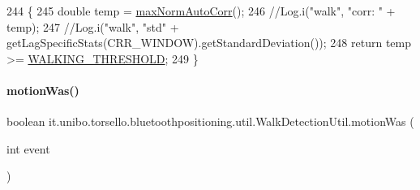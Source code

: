 \begin{DoxyCode}
244                                           \{
245         \textcolor{keywordtype}{double} temp = \hyperlink{classit_1_1unibo_1_1torsello_1_1bluetoothpositioning_1_1util_1_1WalkDetectionUtil_a1145bc9ce4fd56c11ca664eee090b5a1_a1145bc9ce4fd56c11ca664eee090b5a1}{maxNormAutoCorr}();
246         \textcolor{comment}{//Log.i("walk", "corr: " + temp);}
247         \textcolor{comment}{//Log.i("walk", "std" + getLagSpecificStats(CRR\_WINDOW).getStandardDeviation());}
248         \textcolor{keywordflow}{return} temp >= \hyperlink{classit_1_1unibo_1_1torsello_1_1bluetoothpositioning_1_1util_1_1WalkDetectionUtil_acb342863aac2cb0746674b64faad451d_acb342863aac2cb0746674b64faad451d}{WALKING\_THRESHOLD};
249     \}
\end{DoxyCode}
\hypertarget{classit_1_1unibo_1_1torsello_1_1bluetoothpositioning_1_1util_1_1WalkDetectionUtil_af8ca05990e58c5911f943c16ea50e8ae_af8ca05990e58c5911f943c16ea50e8ae}{}\label{classit_1_1unibo_1_1torsello_1_1bluetoothpositioning_1_1util_1_1WalkDetectionUtil_af8ca05990e58c5911f943c16ea50e8ae_af8ca05990e58c5911f943c16ea50e8ae} 
\paragraph{\texorpdfstring{motion\+Was()}{motionWas()}}
{\footnotesize\ttfamily boolean it.\+unibo.\+torsello.\+bluetoothpositioning.\+util.\+Walk\+Detection\+Util.\+motion\+Was (\begin{DoxyParamCaption}\item[{int}]{event }\end{DoxyParamCaption})\hspace{0.3cm}{\ttfamily [private]}}


